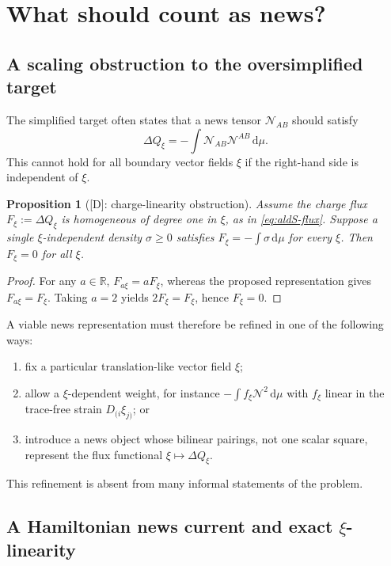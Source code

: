 \documentclass[11pt,a4paper]{article}
\newtheorem{proposition}[theorem]{Proposition}
\newcommand{\diff}{\mathrm{d}}
\newcommand{\statusD}{\textsf{[D]}}
\begin{document}
\section{What should count as news?}

\subsection{A scaling obstruction to the oversimplified target}

The simplified target often states that a news tensor \(\mathcal N_{AB}\) should satisfy
\begin{equation}
  \Delta Q_\xi=-\int \mathcal N_{AB}\mathcal N^{AB}\,\diff\mu .
\end{equation}
This cannot hold for all boundary vector fields \(\xi\) if the right-hand side is independent of \(\xi\).

\begin{proposition}[\statusD: charge-linearity obstruction]
Assume the charge flux \(F_\xi:=\Delta Q_\xi\) is homogeneous of degree one in \(\xi\), as in \eqref{eq:aldS-flux}.  Suppose a single \(\xi\)-independent density \(\sigma\ge0\) satisfies \(F_\xi=-\int\sigma\,\diff\mu\) for every \(\xi\).  Then \(F_\xi=0\) for all \(\xi\).
\end{proposition}
\begin{proof}
For any \(a\in\mathbb{R}\), \(F_{a\xi}=aF_\xi\), whereas the proposed representation gives \(F_{a\xi}=F_\xi\).  Taking \(a=2\) yields \(2F_\xi=F_\xi\), hence \(F_\xi=0\).
\end{proof}

A viable news representation must therefore be refined in one of the following ways:
\begin{enumerate}
  \item fix a particular translation-like vector field \(\xi\);
  \item allow a \(\xi\)-dependent weight, for instance \(-\int f_\xi \mathcal N^2\,\diff\mu\) with \(f_\xi\) linear in the trace-free strain \(D_{(i}\xi_{j)}\); or
  \item introduce a news object whose bilinear pairings, not one scalar square, represent the flux functional \(\xi\mapsto\Delta Q_\xi\).
\end{enumerate}
This refinement is absent from many informal statements of the problem.

\subsection{A Hamiltonian news current and exact \(\xi\)-linearity}
\end{document}
